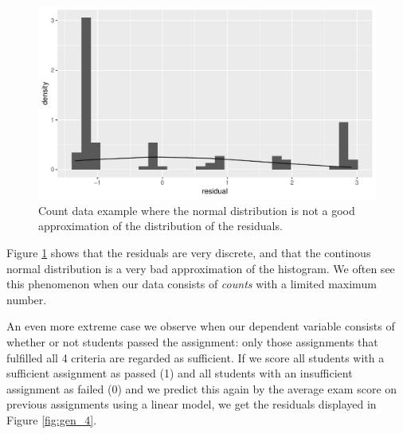 \documentclass[]{report}\usepackage[]{graphicx}\usepackage[]{color}
\makeatletter
\def\maxwidth{ %
  \ifdim\Gin@nat@width>\linewidth
    \linewidth
  \else
    \Gin@nat@width
  \fi
}
\newenvironment{knitrout}{}{} %
\makeatother
\begin{document}
\begin{knitrout}
\color{fgcolor}\begin{figure}

{\centering \includegraphics[width=\maxwidth]{figure/gen_3-1} 

}

\caption[Count data example where the normal distribution is not a good approximation of the distribution of the residuals]{Count data example where the normal distribution is not a good approximation of the distribution of the residuals.}\label{fig:gen_3}
\end{figure}


\end{knitrout}


Figure \ref{fig:gen_3} shows that the residuals are very discrete, and that the continous normal distribution is a very bad approximation of the histogram. We often see this phenomenon when our data consists of \textit{counts} with a limited maximum number.

An even more extreme case we observe when our dependent variable consists of whether or not students passed the assignment: only those assignments that fulfilled all 4 criteria are regarded as sufficient. If we score all students with a sufficient assignment as passed (1) and all students with an insufficient assignment as failed (0) and we predict this again by the average exam score on previous assignments using a linear model, we get the residuals displayed in Figure \ref{fig:gen_4}.
\end{document}
